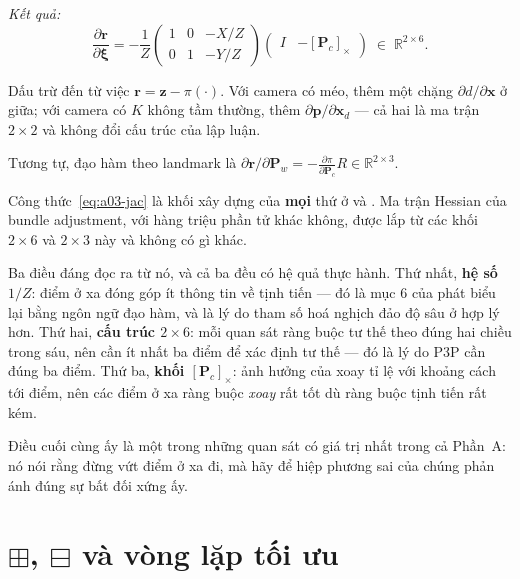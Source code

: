 \documentclass[../../vslam.tex]{subfiles}
\begin{document}
\emph{Kết quả:}
\begin{equation}
\frac{\partial \mathbf{r}}{\partial \boldsymbol{\xi}}
= -\frac{1}{Z}\begin{pmatrix} 1 & 0 & -X/Z \\ 0 & 1 & -Y/Z\end{pmatrix}
\begin{pmatrix} I & -[\mathbf{P}_c]_\times \end{pmatrix}
\;\in\; \mathbb{R}^{2\times 6}.
\label{eq:a03-jac}
\end{equation}

Dấu trừ đến từ việc \(\mathbf{r} = \mathbf{z} - \pi(\cdot)\). Với camera có méo, thêm một chặng \(\partial d/\partial \mathbf{x}\) ở giữa; với camera có \(K\) không tầm thường, thêm \(\partial \mathbf{p}/\partial \mathbf{x}_d\) --- cả hai là ma trận \(2\times 2\) và không đổi cấu trúc của lập luận.

Tương tự, đạo hàm theo landmark là \(\partial\mathbf{r}/\partial\mathbf{P}_w = -\frac{\partial\pi}{\partial\mathbf{P}_c} R \in \mathbb{R}^{2\times 3}\).

\begin{cannho}
Công thức~\eqref{eq:a03-jac} là khối xây dựng của \textbf{mọi} thứ ở  và . Ma trận Hessian của bundle adjustment, với hàng triệu phần tử khác không, được lắp từ các khối \(2\times 6\) và \(2\times 3\) này và không có gì khác.

Ba điều đáng đọc ra từ nó, và cả ba đều có hệ quả thực hành. Thứ nhất, \textbf{hệ số \(1/Z\)}: điểm ở xa đóng góp ít thông tin về tịnh tiến --- đó là mục 6 của  phát biểu lại bằng ngôn ngữ đạo hàm, và là lý do tham số hoá nghịch đảo độ sâu ở  hợp lý hơn. Thứ hai, \textbf{cấu trúc \(2\times 6\)}: mỗi quan sát ràng buộc tư thế theo đúng hai chiều trong sáu, nên cần ít nhất ba điểm để xác định tư thế --- đó là lý do P3P cần đúng ba điểm. Thứ ba, \textbf{khối \([\mathbf{P}_c]_\times\)}: ảnh hưởng của xoay tỉ lệ với khoảng cách tới điểm, nên các điểm ở xa ràng buộc \emph{xoay} rất tốt dù ràng buộc tịnh tiến rất kém.

Điều cuối cùng ấy là một trong những quan sát có giá trị nhất trong cả Phần~A: nó nói rằng đừng vứt điểm ở xa đi, mà hãy để hiệp phương sai của chúng phản ánh đúng sự bất đối xứng ấy.
\end{cannho}

\section{\(\boxplus\), \(\boxminus\) và vòng lặp tối ưu}
\end{document}
